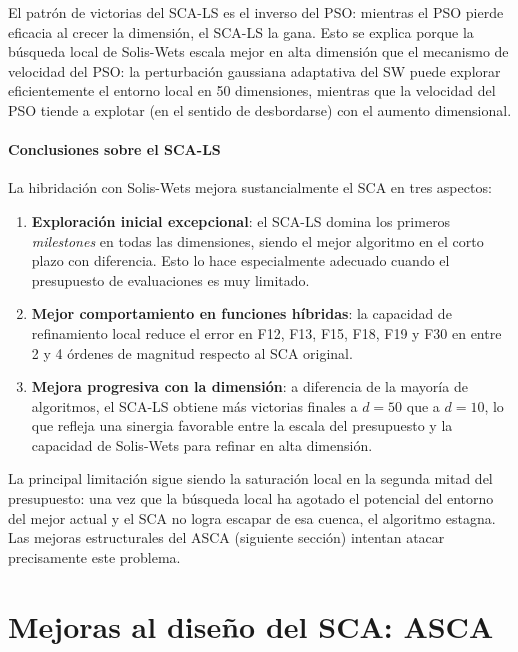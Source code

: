 \documentclass[12pt,a4paper]{article}
\begin{document}
El patrón de victorias del SCA-LS es el inverso del PSO: mientras el PSO pierde eficacia al crecer la dimensión, el SCA-LS la gana. Esto se explica porque la búsqueda local de Solis-Wets escala mejor en alta dimensión que el mecanismo de velocidad del PSO: la perturbación gaussiana adaptativa del SW puede explorar eficientemente el entorno local en 50 dimensiones, mientras que la velocidad del PSO tiende a explotar (en el sentido de desbordarse) con el aumento dimensional.

\subsection{Conclusiones sobre el SCA-LS}

La hibridación con Solis-Wets mejora sustancialmente el SCA en tres aspectos:

\begin{enumerate}
  \item \textbf{Exploración inicial excepcional}: el SCA-LS domina los primeros \textit{milestones} en todas las dimensiones, siendo el mejor algoritmo en el corto plazo con diferencia. Esto lo hace especialmente adecuado cuando el presupuesto de evaluaciones es muy limitado.
  \item \textbf{Mejor comportamiento en funciones híbridas}: la capacidad de refinamiento local reduce el error en F12, F13, F15, F18, F19 y F30 en entre 2 y 4 órdenes de magnitud respecto al SCA original.
  \item \textbf{Mejora progresiva con la dimensión}: a diferencia de la mayoría de algoritmos, el SCA-LS obtiene más victorias finales a $d=50$ que a $d=10$, lo que refleja una sinergia favorable entre la escala del presupuesto y la capacidad de Solis-Wets para refinar en alta dimensión.
\end{enumerate}

La principal limitación sigue siendo la saturación local en la segunda mitad del presupuesto: una vez que la búsqueda local ha agotado el potencial del entorno del mejor actual y el SCA no logra escapar de esa cuenca, el algoritmo estagna. Las mejoras estructurales del ASCA (siguiente sección) intentan atacar precisamente este problema.

\part{Mejoras al diseño del SCA: ASCA}\label{part:asca}
\end{document}
